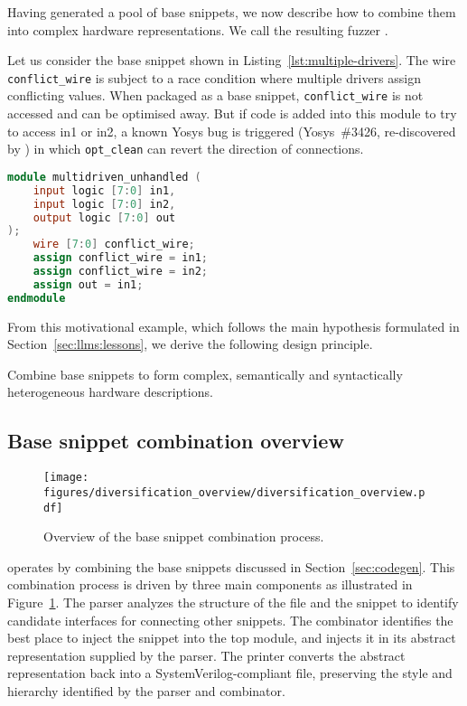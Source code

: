 Having generated a pool of base snippets, we now describe how to combine them into complex hardware representations.
We call the resulting fuzzer \ourname.


Let us consider the base snippet shown in Listing~\ref{lst:multiple-drivers}.
The wire \texttt{conflict\_wire} is subject to a race condition where multiple drivers assign conflicting values.
When packaged as a base snippet, \texttt{conflict\_wire} is not accessed and can be optimised away.
But if code is added into this module to try to access in1 or in2, a known Yosys bug is triggered (Yosys~\#3426, re-discovered by \ourname)
in which \texttt{opt\_clean} can revert the direction of connections.

\begin{lstlisting}[language=verilog,caption={Example of a snippet with multiple drivers to a same variable that is not used.},label={lst:multiple-drivers},breaklines=true]
module multidriven_unhandled (
    input logic [7:0] in1,
    input logic [7:0] in2,
    output logic [7:0] out
);
    wire [7:0] conflict_wire;
    assign conflict_wire = in1;
    assign conflict_wire = in2;
    assign out = in1;
endmodule

\end{lstlisting}

From this motivational example, which follows the main hypothesis formulated in Section~\ref{sec:llms:lessons}, we derive the following design principle.

\begin{newdesignprinciple}
    Combine base snippets to form complex, semantically and syntactically heterogeneous hardware descriptions.
\end{newdesignprinciple}

\subsection{Base snippet combination overview}
\label{sec:complex-code:base-snippet-combination-overview}

\begin{figure}[t]
    \centering
    \texttt{[image: figures/diversification\_overview/diversification\_overview.pdf]}
    \caption{Overview of the base snippet combination process.}
    \label{fig:diversification_overview}
\end{figure}


\ourname operates by combining the base snippets discussed in Section~\ref{sec:codegen}.
This combination process is driven by three main components as illustrated in Figure~\ref{fig:diversification_overview}.
The parser analyzes the structure of the file and the snippet to identify candidate interfaces for connecting other snippets.
The combinator identifies the best place to inject the snippet into the top module, and injects it in its abstract representation supplied by the parser.
The printer converts the abstract representation back into a SystemVerilog-compliant file, preserving the style and hierarchy identified by the parser and combinator.

